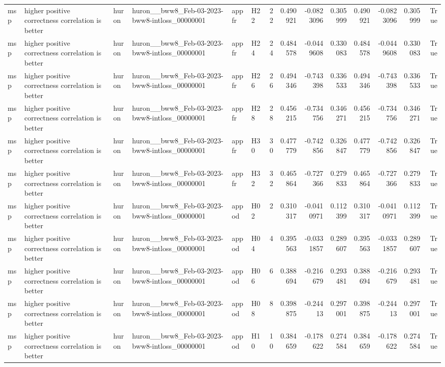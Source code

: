 \begin{longtable}{llllllrrrrrrrr}
msp & higher positive correctness correlation is better & huron & huron\_\_bww8\_Feb-03-2023-bww8-intloss\_00000001 & appfr & H22 & 22 & 0.490921 & -0.0823096 & 0.305999 & 0.490921 & -0.0823096 & 0.305999 & True \\
msp & higher positive correctness correlation is better & huron & huron\_\_bww8\_Feb-03-2023-bww8-intloss\_00000001 & appfr & H24 & 24 & 0.484578 & -0.0449608 & 0.330083 & 0.484578 & -0.0449608 & 0.330083 & True \\
msp & higher positive correctness correlation is better & huron & huron\_\_bww8\_Feb-03-2023-bww8-intloss\_00000001 & appfr & H26 & 26 & 0.494346 & -0.743398 & 0.336533 & 0.494346 & -0.743398 & 0.336533 & True \\
msp & higher positive correctness correlation is better & huron & huron\_\_bww8\_Feb-03-2023-bww8-intloss\_00000001 & appfr & H28 & 28 & 0.456215 & -0.734756 & 0.346271 & 0.456215 & -0.734756 & 0.346271 & True \\
msp & higher positive correctness correlation is better & huron & huron\_\_bww8\_Feb-03-2023-bww8-intloss\_00000001 & appfr & H30 & 30 & 0.477779 & -0.742856 & 0.326847 & 0.477779 & -0.742856 & 0.326847 & True \\
msp & higher positive correctness correlation is better & huron & huron\_\_bww8\_Feb-03-2023-bww8-intloss\_00000001 & appfr & H32 & 32 & 0.465864 & -0.727366 & 0.279833 & 0.465864 & -0.727366 & 0.279833 & True \\
msp & higher positive correctness correlation is better & huron & huron\_\_bww8\_Feb-03-2023-bww8-intloss\_00000001 & appod & H02 & 2 & 0.310317 & -0.0410971 & 0.112399 & 0.310317 & -0.0410971 & 0.112399 & True \\
msp & higher positive correctness correlation is better & huron & huron\_\_bww8\_Feb-03-2023-bww8-intloss\_00000001 & appod & H04 & 4 & 0.395563 & -0.0331857 & 0.289607 & 0.395563 & -0.0331857 & 0.289607 & True \\
msp & higher positive correctness correlation is better & huron & huron\_\_bww8\_Feb-03-2023-bww8-intloss\_00000001 & appod & H06 & 6 & 0.388694 & -0.216679 & 0.293481 & 0.388694 & -0.216679 & 0.293481 & True \\
msp & higher positive correctness correlation is better & huron & huron\_\_bww8\_Feb-03-2023-bww8-intloss\_00000001 & appod & H08 & 8 & 0.398875 & -0.24413 & 0.297001 & 0.398875 & -0.24413 & 0.297001 & True \\
msp & higher positive correctness correlation is better & huron & huron\_\_bww8\_Feb-03-2023-bww8-intloss\_00000001 & appod & H10 & 10 & 0.384659 & -0.178622 & 0.274584 & 0.384659 & -0.178622 & 0.274584 & True \\

\end{longtable}
